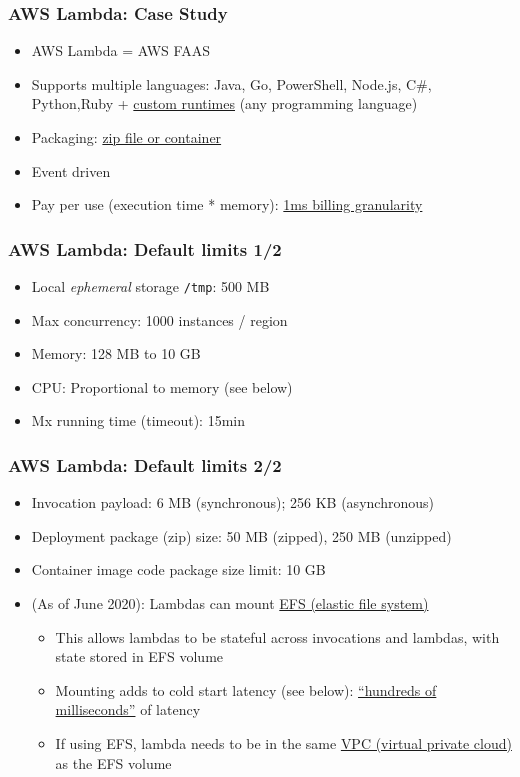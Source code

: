 \documentclass[11pt,aspectratio=169]{beamer}
\begin{document}
\begin{nrcanFrame}
  \frametitle{AWS Lambda: Case Study}
  \begin{itemize}
  \item AWS Lambda  = AWS FAAS
  \item Supports multiple languages: Java, Go, PowerShell, Node.js, C\#, Python,Ruby + \href{https://docs.aws.amazon.com/lambda/latest/dg/runtimes-custom.html}{custom runtimes} (any programming language)
  \item Packaging:
    \href{https://docs.aws.amazon.com/lambda/latest/dg/gettingstarted-package.html}
    {zip file or container}
  \item Event driven
  \item Pay per use (execution time * memory): \href{https://aws.amazon.com/blogs/aws/new-for-aws-lambda-1ms-billing-granularity-adds-cost-savings/}{1ms billing granularity}
  \end{itemize}
\end{nrcanFrame}


\begin{nrcanFrame}
  \frametitle{AWS Lambda: Default limits 1/2}
  \begin{itemize}
  \item Local \textit{ephemeral} storage \texttt{/tmp}: 500 MB 
  \item Max concurrency: 1000 instances / region
  \item Memory: 128 MB to 10 GB
  \item CPU: Proportional to memory (see below)
  \item Mx running time (timeout): 15min
  \end{itemize}
\end{nrcanFrame}




\begin{nrcanFrame}
  \frametitle{AWS Lambda: Default limits 2/2}
  \begin{itemize}
  \item Invocation payload: 6 MB (synchronous); 256 KB (asynchronous)
  \item Deployment package (zip) size: 50 MB (zipped), 250 MB (unzipped)
  \item Container image code package size limit: 10 GB
  \item (As of June 2020): Lambdas can mount \href{https://aws.amazon.com/efs/}{EFS (elastic file system)}
    \begin{itemize}
    \item This allows lambdas to be stateful across invocations and lambdas, with state stored in EFS volume
    \item Mounting adds to cold start latency (see below):
      \href{https://aws.amazon.com/blogs/compute/using-amazon-efs-for-aws-lambda-in-your-serverless-applications/}{``hundreds
        of milliseconds''} of latency
    \item If using EFS, lambda needs to be in the same
      \href{https://aws.amazon.com/vpc/}{VPC (virtual private cloud)} as the EFS volume
    \end{itemize}
  \end{itemize}
\end{nrcanFrame}
\end{document}
